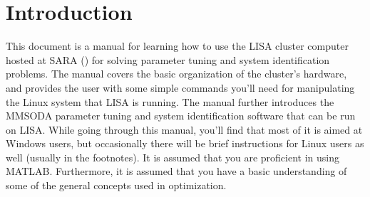 \chapter{Introduction}
\label{ch:introduction}


This document is a manual for learning how to use the LISA cluster computer hosted at SARA () for solving parameter tuning and system identification problems. The manual covers the basic organization of the cluster's hardware, and provides the user with some simple commands you'll need for manipulating the Linux system that LISA is running. The manual further introduces the MMSODA parameter tuning and system identification software that can be run on LISA. While going through this manual, you'll find that most of it is aimed at Windows users, but occasionally there will be brief instructions for Linux users as well (usually in the footnotes). It is assumed that you are proficient in using MATLAB. Furthermore, it is assumed that you have a basic understanding of some of the general concepts used in optimization.

\setcounter{smallqcounter}{0}

